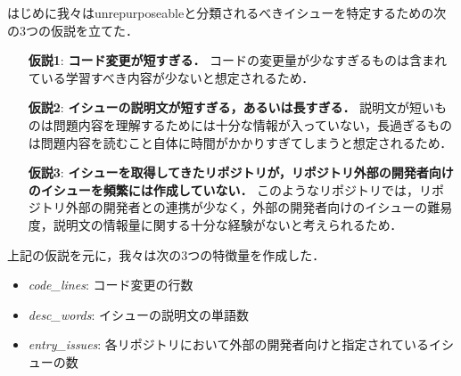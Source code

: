 
はじめに我々はunrepurposeableと分類されるべきイシューを特定するための次の3つの仮説を立てた．
\begin{itemize}
\item[\textbf{仮説1}: ] \textbf{コード変更が短すぎる．} コードの変更量が少なすぎるものは含まれている学習すべき内容が少ないと想定されるため．
\item[\textbf{仮説2}: ] \textbf{イシューの説明文が短すぎる，あるいは長すぎる．} 説明文が短いものは問題内容を理解するためには十分な情報が入っていない，長過ぎるものは問題内容を読むこと自体に時間がかかりすぎてしまうと想定されるため．
\item[\textbf{仮説3}: ] \textbf{イシューを取得してきたリポジトリが，リポジトリ外部の開発者向けのイシューを頻繁には作成していない．} このようなリポジトリでは，リポジトリ外部の開発者との連携が少なく，外部の開発者向けのイシューの難易度，説明文の情報量に関する十分な経験がないと考えられるため．
\end{itemize}


上記の仮説を元に，我々は次の3つの特徴量を作成した．


\begin{itemize}
  \item \textit{code\_lines}: コード変更の行数
  \item \textit{desc\_words}: イシューの説明文の単語数
  \item \textit{entry\_issues}: 各リポジトリにおいて外部の開発者向けと指定されているイシューの数
\end{itemize}

